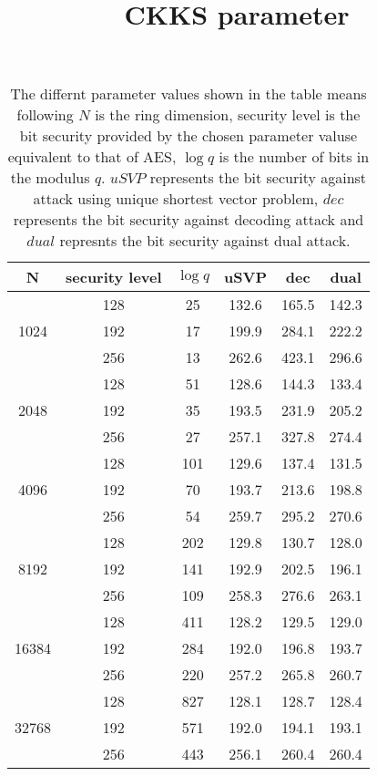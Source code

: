 \documentclass[a4paper,10pt]{article}
\title{CKKS parameter}
\author{}
\date{}
\begin{document}
\maketitle




\begin{center}
\begin{table}
\begin{tabular}{|c|c|c|c|c|c|}
\hline
N  &  security level & $\log q$ &  uSVP & dec & dual  \\
\hline
\multirow{3}{4em}{1024} & 128 & 25 & 132.6 & 165.5 & 142.3 \\
& 192 & 17 & 199.9 & 284.1 & 222.2 \\
& 256 & 13 & 262.6 & 423.1 & 296.6 \\
\hline
\multirow{3}{4em}{2048} & 128 & 51 & 128.6 & 144.3 & 133.4 	\\
& 192 & 35 & 193.5 & 231.9 & 205.2 \\
& 256 & 27 & 257.1 & 327.8 & 274.4 \\
\hline
\multirow{3}{4em}{4096} & 128 & 101 & 129.6 & 137.4 & 131.5  \\
& 192 & 70 & 193.7 & 213.6 & 198.8 \\
& 256 & 54 & 259.7 & 295.2 & 270.6 \\
\hline
\multirow{3}{4em}{8192} & 128 & 202 & 129.8 & 130.7 & 128.0\\
& 192 & 141 & 192.9 & 202.5 & 196.1\\
& 256 & 109 & 258.3 & 276.6 & 263.1\\
\hline
\multirow{3}{4em}{16384} & 128 & 411 & 128.2 & 129.5 & 129.0\\
& 192 & 284 & 192.0 & 196.8 & 193.7\\
& 256 & 220 & 257.2 & 265.8 & 260.7\\
\hline
\multirow{3}{4em}{32768} & 128 & 827 & 128.1 & 128.7 & 128.4\\
& 192 & 571 & 192.0 & 194.1 & 193.1\\
& 256 & 443 & 256.1 & 260.4 & 260.4\\
\hline

\end{tabular}
\caption{The differnt parameter values shown in the table means following $N$ is the ring dimension, security level is the bit security provided by the chosen parameter valuse equivalent to that of AES, $\log q$ is the number of bits in the modulus $q$. $uSVP$ represents the bit security against attack using unique shortest vector problem, $dec$ represents the bit security against decoding attack and $dual$ represnts the bit security against dual attack.}
\end{table}
\end{center}
\end{document}
